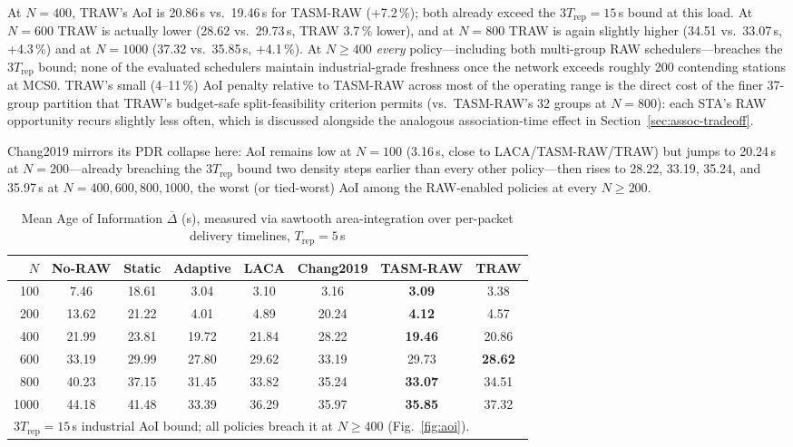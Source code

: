 \documentclass[journal]{IEEEtran}
\begin{document}
At $N\!=\!400$, TRAW's AoI is 20.86\,s vs.\ 19.46\,s for TASM-RAW
(+7.2\,\%); both already exceed the $3T_\mathrm{rep}\!=\!15$\,s bound at
this load.
At $N\!=\!600$ TRAW is actually lower (28.62 vs.\ 29.73\,s,
TRAW 3.7\,\% lower), and at $N\!=\!800$ TRAW is again slightly higher
(34.51 vs.\ 33.07\,s, +4.3\,\%) and at $N\!=\!1000$ (37.32 vs.\ 35.85\,s,
+4.1\,\%).
At $N\!\geq\!400$ \emph{every} policy---including both multi-group
RAW schedulers---breaches the $3T_\mathrm{rep}$ bound; none of the
evaluated schedulers maintain industrial-grade freshness once the
network exceeds roughly 200 contending stations at MCS0.
TRAW's small (4--11\,\%) AoI penalty relative to TASM-RAW across most
of the operating range is the direct cost of the finer 37-group
partition that TRAW's budget-safe split-feasibility criterion permits
(vs.\ TASM-RAW's 32 groups at $N\!=\!800$): each STA's RAW opportunity
recurs slightly less often, which is discussed alongside the analogous
association-time effect in Section~\ref{sec:assoc-tradeoff}.

Chang2019 mirrors its PDR collapse here: AoI remains low at
$N\!=\!100$ (3.16\,s, close to LACA/TASM-RAW/TRAW) but jumps to
20.24\,s at $N\!=\!200$---already breaching the $3T_\mathrm{rep}$
bound two density steps earlier than every other policy---then rises
to 28.22, 33.19, 35.24, and 35.97\,s at $N\!=\!400,600,800,1000$,
the worst (or tied-worst) AoI among the RAW-enabled policies at every
$N\!\geq\!200$.

\begin{table}[!t]
\renewcommand{\arraystretch}{1.15}
\caption{Mean Age of Information $\overline{\Delta}$ (s),
measured via sawtooth area-integration over per-packet delivery
timelines, $T_\mathrm{rep}\!=\!5$\,s}
\label{tab:aoi}
\centering
\setlength{\tabcolsep}{3pt}
\begin{tabular}{@{}rccccccc@{}}
\toprule
$N$ & No-RAW & Static & Adaptive & LACA & Chang2019 & TASM-RAW & TRAW \\
\midrule
 100 &   7.46 &  18.61 &  3.04 &  3.10 & 3.16 & \textbf{3.09} &  3.38 \\
 200 &  13.62 &  21.22 &  4.01 &  4.89 & 20.24 & \textbf{4.12} &  4.57 \\
 400 &  21.99 &  23.81 & 19.72 & 21.84 & 28.22 & \textbf{19.46} & 20.86 \\
 600 &  33.19 &  29.99 & 27.80 & 29.62 & 33.19 & 29.73 & \textbf{28.62} \\
 800 &  40.23 &  37.15 & 31.45 & 33.82 & 35.24 & \textbf{33.07} & 34.51 \\
1000 &  44.18 &  41.48 & 33.39 & 36.29 & 35.97 & \textbf{35.85} & 37.32 \\
\bottomrule
\multicolumn{8}{l}{\footnotesize $3T_\mathrm{rep}\!=\!15$\,s industrial
  AoI bound; all policies breach it at $N\!\geq\!400$ (Fig.~\ref{fig:aoi}).}
\end{tabular}
\end{table}
\end{document}

